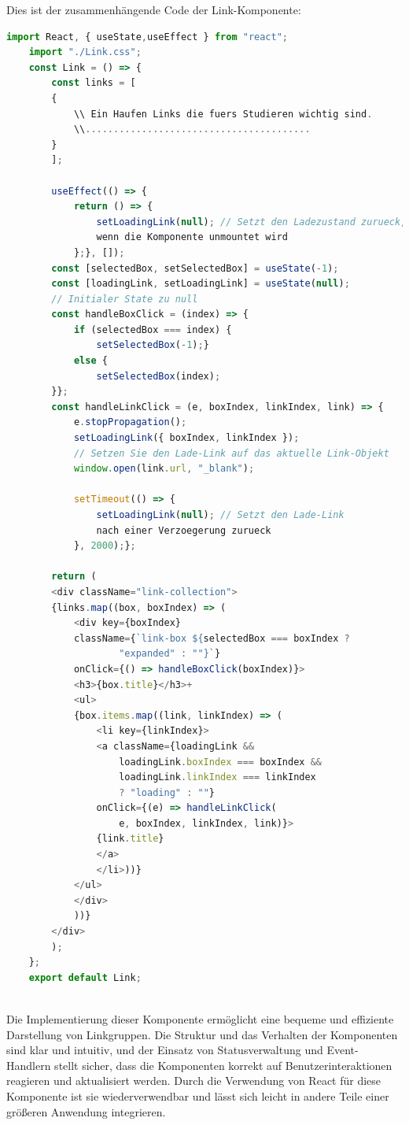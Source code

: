 Dies ist der zusammenhängende Code der Link-Komponente:
\begin{lstlisting}[language=JavaScript,
	frame=single,           % Ein Rahmen um den Code
	framexleftmargin=15pt,  % Rahmen link von den Zahlen
	style=algoBericht,
	label={Links-Komponente},
	captionpos=b ,          % Caption unter den Code setzen
	caption={Links-Komponente}]
	import React, { useState,useEffect } from "react";
	import "./Link.css";
	const Link = () => {
		const links = [
		{
			\\ Ein Haufen Links die fuers Studieren wichtig sind.
			\\........................................
		}
		];
		
		useEffect(() => {
			return () => {
				setLoadingLink(null); // Setzt den Ladezustand zurueck, 
				wenn die Komponente unmountet wird
			};}, []);
		const [selectedBox, setSelectedBox] = useState(-1);
		const [loadingLink, setLoadingLink] = useState(null); 
		// Initialer State zu null
		const handleBoxClick = (index) => {
			if (selectedBox === index) {
				setSelectedBox(-1);} 
			else {
				setSelectedBox(index);
		}};
		const handleLinkClick = (e, boxIndex, linkIndex, link) => {
			e.stopPropagation();
			setLoadingLink({ boxIndex, linkIndex }); 
			// Setzen Sie den Lade-Link auf das aktuelle Link-Objekt
			window.open(link.url, "_blank");
			
			setTimeout(() => {
				setLoadingLink(null); // Setzt den Lade-Link 
				nach einer Verzoegerung zurueck
			}, 2000);};
		
		return (
		<div className="link-collection">
		{links.map((box, boxIndex) => (
			<div key={boxIndex}
			className={`link-box ${selectedBox === boxIndex ? 
					"expanded" : ""}`}
			onClick={() => handleBoxClick(boxIndex)}>
			<h3>{box.title}</h3>+
			<ul>
			{box.items.map((link, linkIndex) => (
				<li key={linkIndex}>
				<a className={loadingLink && 
					loadingLink.boxIndex === boxIndex && 
					loadingLink.linkIndex === linkIndex 
					? "loading" : ""}
				onClick={(e) => handleLinkClick(
					e, boxIndex, linkIndex, link)}>
				{link.title}
				</a>
				</li>))}
			</ul>
			</div>
			))}
		</div>
		);
	};
	export default Link;
	
\end{lstlisting}

Die Implementierung dieser Komponente ermöglicht eine bequeme und effiziente Darstellung von Linkgruppen. Die Struktur und das Verhalten der Komponenten sind klar und intuitiv, und der Einsatz von Statusverwaltung und Event-Handlern stellt sicher, dass die Komponenten korrekt auf Benutzerinteraktionen reagieren und  aktualisiert werden. Durch die Verwendung von React für diese Komponente ist sie wiederverwendbar und lässt sich leicht in andere Teile einer größeren Anwendung integrieren.
\newpage
